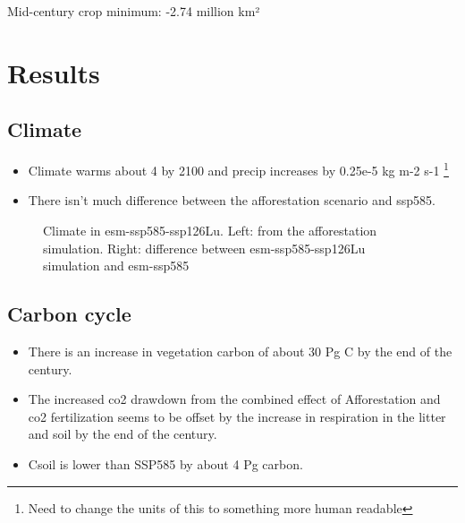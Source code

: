 \documentclass[]{article}
\begin{document}
Mid-century crop minimum: -2.74 million km²

\section{Results}

\subsection{Climate}

\begin{itemize}
    \item Climate warms about 4 \textcelsius{} by 2100 and precip increases by 0.25e-5 kg m-2 s-1 \footnote{Need to change the units of this to something more human readable}

    \item There isn't much difference between the afforestation scenario and ssp585.
\end{itemize}

\begin{figure}[!ht]
    \centering
    \begin{subfigure}[b]{0.45\linewidth}
        
    \end{subfigure}
    \begin{subfigure}[b]{0.45\linewidth}
        
    \end{subfigure}
    \begin{subfigure}[b]{0.45\linewidth}
        
    \end{subfigure}
    \begin{subfigure}[b]{0.45\linewidth}
        
    \end{subfigure}
    \caption{Climate in esm-ssp585-ssp126Lu. Left: from the afforestation simulation. Right: difference between esm-ssp585-ssp126Lu simulation and esm-ssp585}
    \label{fig:climate}
\end{figure}


\subsection{Carbon cycle}

\begin{itemize}
\item There is an increase in vegetation carbon of about 30 Pg C by the end of the century.

\item The increased co2 drawdown from the combined effect of Afforestation and co2 fertilization seems to be offset by the increase in respiration in the litter and soil by the end of the century.

\item Csoil is lower than SSP585 by about 4 Pg carbon.
\end{itemize}
\end{document}
